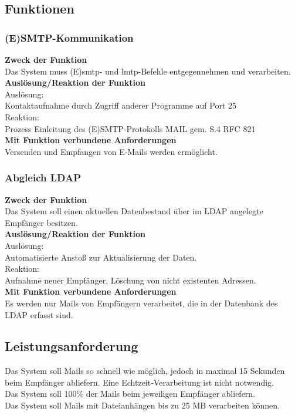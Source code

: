 \subsection{Funktionen}
\subsubsection*{(E)SMTP-Kommunikation}
\textbf{Zweck der Funktion} \\
Das System muss (E)\ac{smtp}- und \ac{lmtp}-Befehle entgegennehmen und verarbeiten. \\
\textbf{Auslösung/Reaktion der Funktion} \\
Auslösung: \\
Kontaktaufnahme durch Zugriff anderer Programme auf Port 25\\
Reaktion:\\
Prozess Einleitung des (E)SMTP-Protokolls MAIL gem. S.4 RFC 821 \\
\textbf{Mit Funktion verbundene Anforderungen} \\
Versenden und Empfangen von E-Mails werden ermöglicht.\\
\subsubsection*{Abgleich LDAP}
\textbf{Zweck der Funktion} \\
Das System soll einen aktuellen Datenbestand über im LDAP angelegte Empfänger besitzen.\\
\textbf{Auslösung/Reaktion der Funktion} \\
Auslösung:\\
Automatisierte Anstoß zur Aktualisierung der Daten.\\
Reaktion:\\
Aufnahme neuer Empfänger, Löschung von nicht existenten Adressen.\\
\textbf{Mit Funktion verbundene Anforderungen}\\
Es werden nur Mails von Empfängern verarbeitet, die in der Datenbank des LDAP erfasst sind.\\
\subsection{Leistungsanforderung}
Das System soll Mails so schnell wie möglich, jedoch in maximal 15 Sekunden beim Empfänger abliefern. Eine Echtzeit-Verarbeitung ist nicht notwendig.\\
Das System soll 100\% der Mails beim jeweiligen Empfänger abliefern.\\
Das System soll Mails mit Dateianhängen bis zu 25 MB verarbeiten können.\\
